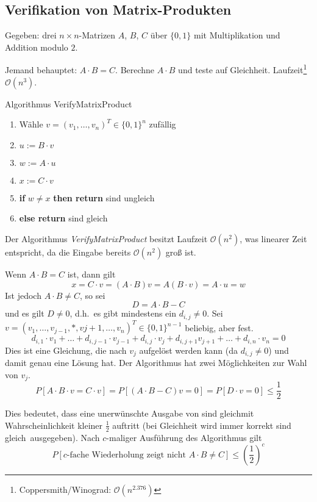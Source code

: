 \subsection{Verifikation von Matrix-Produkten}
Gegeben: drei $n \times n$-Matrizen $A$, $B$, $C$ über $\{0, 1\}$ mit
Multiplikation und Addition modulo $2$.

Jemand behauptet: $A\cdot B = C$. Berechne $A\cdot B$ und teste auf Gleichheit.
Laufzeit\footnote{Coppersmith/Winograd: $\mathcal{O}(n^{2.376})$}
$\mathcal{O}(n^3)$.

\begin{algorithm}
	\caption{Algorithmus VerifyMatrixProduct}
	\vspace{0.4cm}
	\begin{enumerate}
		\setlength{\itemsep}{2pt}
		\setlength{\parskip}{2pt}
		\setlength{\parsep}{2pt}
		\item Wähle $v = \left(v_1, \dots, v_n\right)^T \in \{0, 1\}^n$ zufällig
		\item $u := B\cdot v$
		\item $w := A\cdot u$
		\item $x := C\cdot v$
		\item \textbf{if} $w \not= x$ \textbf{then return} \glqq sind ungleich\grqq
		\item[] \textbf{else return} \glqq sind gleich\grqq
	\end{enumerate}
\end{algorithm}

Der Algorithmus \emph{VerifyMatrixProduct} besitzt Laufzeit $\mathcal{O}(n^2)$,
was linearer Zeit entspricht, da die Eingabe bereits $\mathcal{O}(n^2)$ groß ist.

Wenn $A\cdot B = C$ ist, dann gilt
\[
  x = C \cdot v = \left( A \cdot B \right) v = A \left( B \cdot v \right) = A \cdot u = w
\]
Ist jedoch $A\cdot B \not= C$, so sei
\[
  D = A\cdot B - C
\]
und es gilt $D \not= 0$, d.h.\ es gibt mindestens ein $d_{i,j} \not= 0$. Sei $v
= \left( v_1, \dots, v_{j-1}, \ast, v{j+1}, \dots, v_n \right)^T \in \{0,
1\}^{n-1}$ beliebig, aber fest.
\[
  d_{i,1} \cdot v_1 + \dots + d_{i,j-1} \cdot v_{j-1} + d_{i,j} \cdot v_j +
  d_{i,j+1} v_{j+1} + \dots + d_{i,n} \cdot v_n = 0
\]
Dies ist eine Gleichung, die nach $v_j$ aufgelöst werden kann (da $d_{i,j}
\not= 0$) und damit genau eine Lösung hat. Der Algorithmus hat zwei
Möglichkeiten zur Wahl von $v_j$.
\[
  P\left[ A\cdot B \cdot v = C \cdot v \right] = P\left[ \left(A\cdot B -
  C\right) v = 0 \right] = P\left[ D \cdot v = 0 \right] \leq \frac{1}{2}
\]

Dies bedeutet, dass eine unerwünschte Ausgabe von \glqq sind gleich\grqq mit
Wahrscheinlichkeit kleiner $\frac{1}{2}$ auftritt (bei Gleichheit wird immer
korrekt \glqq sind gleich\grqq\ ausgegeben). Nach $c$-maliger Ausführung des
Algorithmus gilt
\[
  P\left[ \text{$c$-fache Wiederholung zeigt nicht $A\cdot B \not= C$} \right]
  \leq \left(\frac{1}{2}\right)^c
\]
